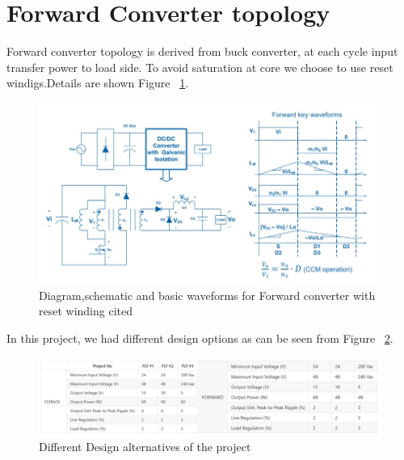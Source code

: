 \documentclass{article}
\begin{document}
\section{Forward Converter topology}
Forward converter topology is derived from buck converter, at each cycle input transfer power to load side. To avoid saturation at core we choose to use reset windigs.Details are shown Figure ~\ref{fig:topology}.
\begin{figure}[H]
    \centering
    \includegraphics[width=0.8\linewidth]{topology.jpeg}
    \caption {Diagram,schematic and basic waveforms for Forward converter with reset winding cited \cite{topology}}
    \label{fig:topology}
\end{figure}
In this project, we had different design options as can be seen from Figure ~\ref{fig:projects}.
\begin{figure}[H]
    \centering
    \includegraphics[width=1\linewidth]{projects.jpeg}
    \caption {Different Design alternatives of the project}
    \label{fig:projects}
\end{figure}
\end{document}
